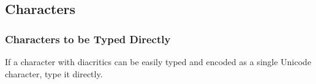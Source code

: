 \tocspace
\subsection{Characters}

\subsubsection{Characters to be Typed Directly}
\label{section characters to be typed directly}

\begin{mainrule}
If a character with diacritics can be easily typed and encoded as a single Unicode character, type it directly.
\end{mainrule}

\mehrzeilen[-2]

\vspace{2mm}
